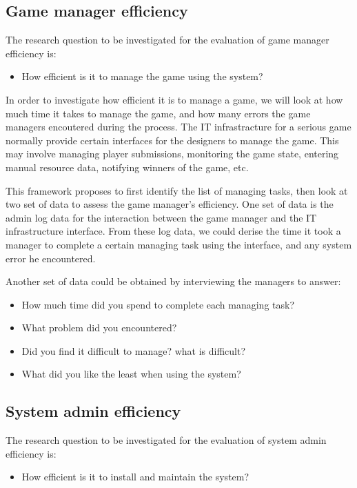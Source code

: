 \subsection{Game manager efficiency}
The research question to be investigated for the evaluation of game manager efficiency is:
\begin{itemize}
\item How efficient is it to manage the game using the system?
\end{itemize}

In order to investigate how efficient it is to manage a game, we will look at how much time it takes to manage the game, and how many errors the game managers encoutered during the process.
The IT infrastracture for a serious game normally provide certain interfaces for the designers to manage the game. This may involve managing player submissions, monitoring the game state, entering manual resource data, notifying winners of the game, etc.

This framework proposes to first identify the list of managing tasks, then look at two set of data to assess the game manager's efficiency. One set of data is the admin log data for the interaction between the game manager and the IT infrastructure interface. From these log data, we could derise the time it took a manager to complete a certain managing task using the interface, and any system error he encountered.

Another set of data could be obtained by interviewing the managers to answer:
\begin{itemize}
\item How much time did you spend to complete each managing task?
\item What problem did you encountered?
\item Did you find it difficult to manage? what is difficult?
\item What did you like the least when using the system?
\end{itemize}

\subsection{System admin efficiency}
The research question to be investigated for the evaluation of system admin efficiency is:
\begin{itemize}
\item How efficient is it to install and maintain the system?
\end{itemize}

